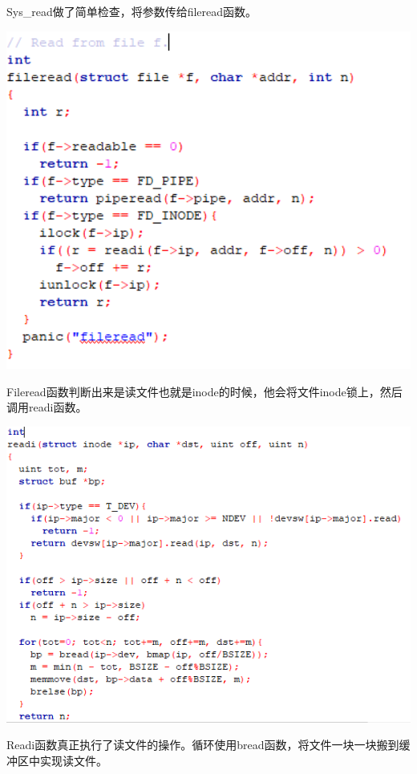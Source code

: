 Sys\_read做了简单检查，将参数传给fileread函数。

\includegraphics[width=6in]{figures/eg_file/image177.png}

Fileread函数判断出来是读文件也就是inode的时候，他会将文件inode锁上，然后调用readi函数。

\includegraphics[width=6in]{figures/eg_file/image178.png}

Readi函数真正执行了读文件的操作。循环使用bread函数，将文件一块一块搬到缓冲区中实现读文件。

